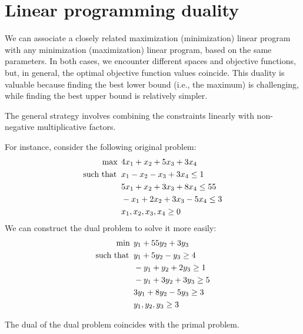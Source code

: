 \section{Linear programming duality}

We can associate a closely related maximization (minimization) linear program with any minimization (maximization) linear program, based on the same parameters.
In both cases, we encounter different spaces and objective functions, but, in general, the optimal objective function values coincide.
This duality is valuable because finding the best lower bound (i.e., the maximum) is challenging, while finding the best upper bound is relatively simpler.

The general strategy involves combining the constraints linearly with non-negative multiplicative factors.
\begin{example}
    For instance, consider the following original problem:
    \begin{align*}
        \max                      \:&\: 4x_1+x_2+5x_3+3x_4          \\
        \textnormal{such that }     &\: x_1-x_2-x_3+3x_4 \leq 1     \\
                                    &\: 5x_1+x_2+3x_3+8x_4 \leq 55  \\
                                    &\: -x_1+2x_2+3x_3-5x_4 \leq 3  \\
                                    &\: x_1,x_2,x_3,x_4 \geq 0      
    \end{align*}
    We can construct the dual problem to solve it more easily:
    \begin{align*}
        \min                      \:&\: y_1+55y_2+3y_3              \\
        \textnormal{such that }     &\: y_1+5y_2-y_3 \geq 4         \\
                                    &\: -y_1+y_2+2y_3 \geq 1        \\
                                    &\: -y_1+3y_2+3y_3 \geq 5       \\
                                    &\: 3y_1+8y_2-5y_3 \geq 3       \\   
                                    &\: y_1,y_2,y_3 \geq 3          \\
    \end{align*}
\end{example}

\begin{property}
    The dual of the dual problem coincides with the primal problem. 
\end{property}

